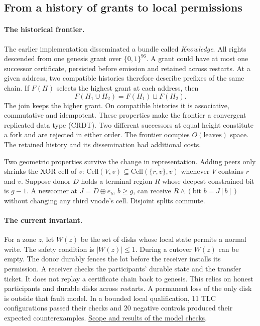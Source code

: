 \documentclass[11pt]{article}
\begin{document}
\subsection{From a history of grants to local permissions}
\paragraph{The historical frontier.}
The earlier implementation disseminated a bundle called \emph{Knowledge}. All rights descended from one genesis grant over $\{0,1\}^{96}$. A grant could have at most one successor certificate, persisted before emission and retained across restarts. At a given address, two compatible histories therefore describe prefixes of the same chain. If $F(H)$ selects the highest grant at each address, then
\[
F(H_1 \cup H_2) = F(H_1) \sqcup F(H_2).
\]
The join keeps the higher grant. On compatible histories it is associative, commutative and idempotent. These properties make the frontier a convergent replicated data type (CRDT). Two different successors at equal height constitute a fork and are rejected in either order. The frontier occupies $O(\text{leaves})$ space. The retained history and its dissemination had additional costs.

Two geometric properties survive the change in representation. Adding peers only shrinks the XOR cell of $v$: $\mathrm{Cell}(V,v)\subseteq\mathrm{Cell}(\{r,v\},v)$ whenever $V$ contains $r$ and $v$. Suppose donor $D$ holds a terminal region $R$ whose deepest constrained bit is $g-1$. A newcomer at $J=D\oplus e_b$, $b\geq g$, can receive $R\wedge(\text{bit }b=J[b])$ without changing any third vnode's cell. Disjoint splits commute.

\paragraph{The current invariant.}
For a zone $z$, let $W(z)$ be the set of disks whose local state permits a normal write. The safety condition is $|W(z)|\leq 1$. During a cutover $W(z)$ can be empty. The donor durably fences the lot before the receiver installs its permission. A receiver checks the participants' durable state and the transfer ticket. It does not replay a certificate chain back to genesis. This relies on honest participants and durable disks across restarts. A permanent loss of the only disk is outside that fault model. In a bounded local qualification, 11 TLC configurations passed their checks and 20 negative controls produced their expected counterexamples. \href{https://github.com/indexus/core/blob/e4b9072/docs/protocol/local-permissions-verification.md}{Scope and results of the model checks}.
\end{document}
